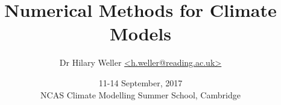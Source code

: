 
\title{Numerical Methods for Climate Models}


\author{Dr Hilary Weller \url{<h.weller@reading.ac.uk>}\\
}


\date{11-14 September, 2017\\
\vspace{1cm}
NCAS Climate Modelling Summer School, Cambridge}\maketitle


